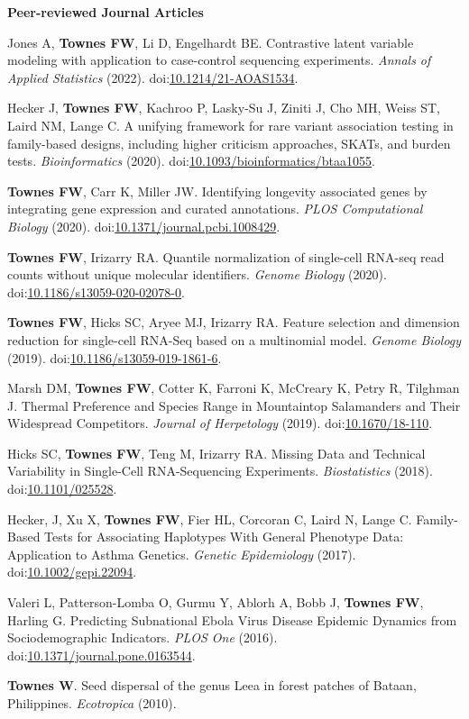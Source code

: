 \documentclass[10pt]{article}
\newcommand\doilink[1]{\href{https://dx.doi.org/#1}{#1}}
\newcommand\doi[1]{doi:\doilink{#1}}
\begin{document}
\textbf{Peer-reviewed Journal Articles}
\begin{enumerate}[label= {[\arabic*]}]
\item Jones A, {\bf Townes FW}, Li D, Engelhardt BE. Contrastive latent variable modeling with application to case-control sequencing experiments. {\it Annals of Applied Statistics} (2022). \newline \doi{10.1214/21-AOAS1534}.
\item Hecker J, {\bf Townes FW}, Kachroo P, Lasky-Su J, Ziniti J, Cho MH, Weiss ST, Laird NM, Lange C. A unifying framework for rare variant association testing in family-based designs, including higher criticism approaches, SKATs, and burden tests. {\it Bioinformatics} (2020). \newline \doi{10.1093/bioinformatics/btaa1055}.
\item {\bf Townes FW}, Carr K, Miller JW. Identifying longevity associated genes by integrating gene expression and curated annotations. {\it PLOS Computational Biology} (2020). \newline \doi{10.1371/journal.pcbi.1008429}.
\item {\bf Townes FW}, Irizarry RA. Quantile normalization of single-cell RNA-seq read counts without unique molecular identifiers. {\it Genome Biology} (2020). \doi{10.1186/s13059-020-02078-0}.
\item {\bf Townes FW}, Hicks SC, Aryee MJ, Irizarry RA. Feature selection and dimension reduction for single-cell RNA-Seq based on a multinomial model. {\it Genome Biology} (2019). \doi{10.1186/s13059-019-1861-6}.
\item Marsh DM, {\bf Townes FW}, Cotter K, Farroni K, McCreary K, Petry R, Tilghman J. Thermal Preference and Species Range in Mountaintop Salamanders and Their Widespread Competitors. {\it Journal of Herpetology} (2019). \doi{10.1670/18-110}.
\item Hicks SC, {\bf Townes FW}, Teng M, Irizarry RA. Missing Data and Technical Variability in Single-Cell RNA-Sequencing Experiments. {\it Biostatistics} (2018). \doi{10.1101/025528}.
\item Hecker, J, Xu X, {\bf Townes FW}, Fier HL, Corcoran C, Laird N, Lange C. Family-Based Tests for Associating Haplotypes With General Phenotype Data: Application to Asthma Genetics. {\it Genetic Epidemiology} (2017). \doi{10.1002/gepi.22094}.
\item Valeri L, Patterson-Lomba O, Gurmu Y, Ablorh A, Bobb J, {\bf Townes FW}, Harling G. Predicting Subnational Ebola Virus Disease Epidemic Dynamics from Sociodemographic Indicators. {\it PLOS One} (2016). \doi{10.1371/journal.pone.0163544}.
\item {\bf Townes W}. Seed dispersal of the genus Leea in forest patches of Bataan, Philippines. {\it Ecotropica } (2010).
\end{enumerate}
\end{document}
